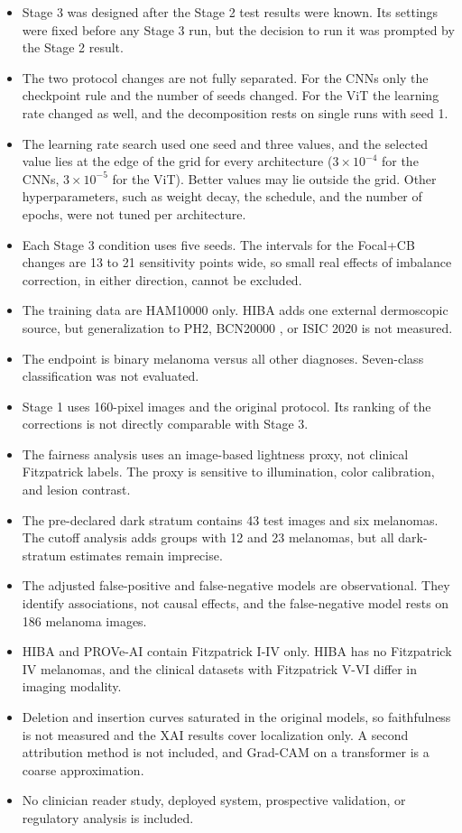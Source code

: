 \documentclass[11pt]{article}
\begin{document}
\begin{itemize}
  \item Stage 3 was designed after the Stage 2 test results were known. Its settings were fixed before any Stage 3 run, but the decision to run it was prompted by the Stage 2 result.
  \item The two protocol changes are not fully separated. For the CNNs only the checkpoint rule and the number of seeds changed. For the ViT the learning rate changed as well, and the decomposition rests on single runs with seed 1.
  \item The learning rate search used one seed and three values, and the selected value lies at the edge of the grid for every architecture ($3\times10^{-4}$ for the CNNs, $3\times10^{-5}$ for the ViT). Better values may lie outside the grid. Other hyperparameters, such as weight decay, the schedule, and the number of epochs, were not tuned per architecture.
  \item Each Stage 3 condition uses five seeds. The intervals for the Focal+CB changes are 13 to 21 sensitivity points wide, so small real effects of imbalance correction, in either direction, cannot be excluded.
  \item The training data are HAM10000 only. HIBA adds one external dermoscopic source, but generalization to PH2, BCN20000 \citep{combalia2019bcn20000}, or ISIC 2020 is not measured.
  \item The endpoint is binary melanoma versus all other diagnoses. Seven-class classification was not evaluated.
  \item Stage 1 uses 160-pixel images and the original protocol. Its ranking of the corrections is not directly comparable with Stage 3.
  \item The fairness analysis uses an image-based lightness proxy, not clinical Fitzpatrick labels. The proxy is sensitive to illumination, color calibration, and lesion contrast.
  \item The pre-declared dark stratum contains 43 test images and six melanomas. The cutoff analysis adds groups with 12 and 23 melanomas, but all dark-stratum estimates remain imprecise.
  \item The adjusted false-positive and false-negative models are observational. They identify associations, not causal effects, and the false-negative model rests on 186 melanoma images.
  \item HIBA and PROVe-AI contain Fitzpatrick I-IV only. HIBA has no Fitzpatrick IV melanomas, and the clinical datasets with Fitzpatrick V-VI differ in imaging modality.
  \item Deletion and insertion curves saturated in the original models, so faithfulness is not measured and the XAI results cover localization only. A second attribution method is not included, and Grad-CAM on a transformer is a coarse approximation.
  \item No clinician reader study, deployed system, prospective validation, or regulatory analysis is included.
\end{itemize}
\end{document}

